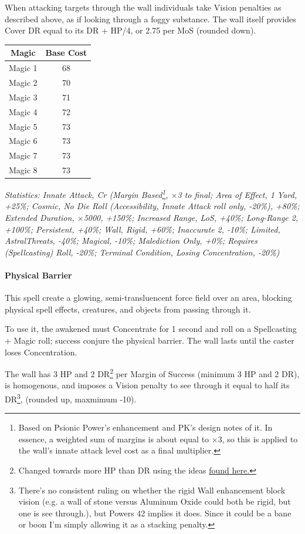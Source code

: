 \begin{multicols}{3}
	When attacking targets through the wall individuals take Vision penalties as described above, as if looking through a foggy substance. The wall itself provides Cover DR equal to its DR + HP/4, or 2.75 per MoS (rounded down).
	
	\begin{center}
		\begin{tabular}{|c|c|}
			\hline
			Magic & Base Cost \\
			\hline
			\hline
			Magic 1 & 68 \\
			Magic 2 & 70 \\
			Magic 3 & 71 \\
			Magic 4 & 72 \\
			Magic 5 & 73 \\
			Magic 6 & 73 \\
			Magic 7 & 73 \\
			Magic 8 & 73 \\
			\hline
		\end{tabular}
	\end{center}
	
	\textcolor{OliveGreen}{\textit{Statistics: Innate Attack, Cr (Margin Based\footnote{Based on Psionic Power's enhancement and PK's design notes of it. In essence, a weighted sum of margins is about equal to $\times$3, so this is applied to the wall's innate attack level cost as a final multiplier.}, $\times$3 to final; Area of Effect, 1 Yard, +25\%; Cosmic, No Die Roll (Accessibility, Innate Attack roll only, -20\%), +80\%; Extended Duration, $\times$5000, +150\%; Increased Range, LoS, +40\%; Long-Range 2, +100\%; Persistent, +40\%; Wall, Rigid, +60\%; Inaccurate 2, -10\%; Limited, AstralThreats, -40\%; Magical, -10\%; Malediction Only, +0\%; Requires (Spellcasting) Roll, -20\%; Terminal Condition, Losing Concentration, -20\%)}}
	
	\paragraph{Physical Barrier}
	
	This spell create a glowing, semi-transluencent force field over an area, blocking physical spell effects, creatures, and objects from passing through it.
	
	To use it, the awakened must Concentrate for 1 second and roll on a Spellcasting + Magic roll; success conjure the physical barrier. The wall lasts until the caster loses Concentration.
	
	The wall has 3 HP and 2 DR\footnote{Changed towards more HP than DR using the ideas \textcolor{Blue}{\href{http://forums.sjgames.com/showpost.php?p=2050064&postcount=3}{found here.}}} per Margin of Success (minimum 3 HP and 2 DR), is homogenous, and imposes a Vision penalty to see through it equal to half its DR\footnote{There's no consistent ruling on whether the rigid Wall enhancement block vision (e.g. a wall of stone versus Aluminum Oxide could both be rigid, but one is see through.), but Powers 42 implies it does. Since it could be a bane or boon I'm simply allowing it as a stacking penalty.}, (rounded up, maxmimum -10).
		

\end{multicols}
